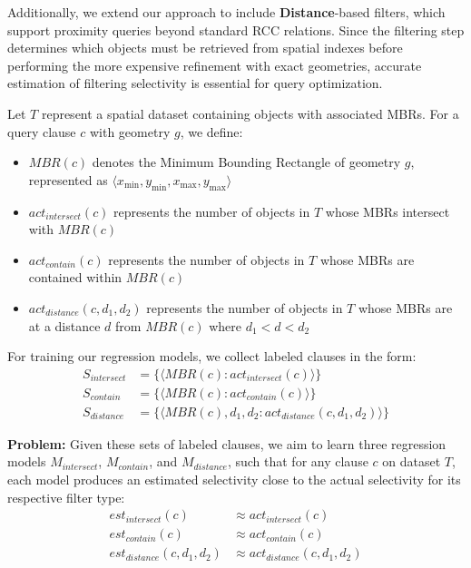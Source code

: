 \documentclass{article}
\begin{document}
Additionally, we extend our approach to include \textbf{Distance}-based filters, which support proximity queries beyond standard RCC relations. Since the filtering step determines which objects must be retrieved from spatial indexes before performing the more expensive refinement with exact geometries, accurate estimation of filtering selectivity is essential for query optimization.

Let $T$ represent a spatial dataset containing objects with associated MBRs. For a query clause $c$ with geometry $g$, we define:

\begin{itemize}
\item $MBR(c)$ denotes the Minimum Bounding Rectangle of geometry $g$, represented as $\langle x_{\min}, y_{\min}, x_{\max}, y_{\max} \rangle$
\item $act_{intersect}(c)$ represents the number of objects in $T$ whose MBRs intersect with $MBR(c)$
\item $act_{contain}(c)$ represents the number of objects in $T$ whose MBRs are contained within $MBR(c)$
\item $act_{distance}(c, d_1, d_2)$ represents the number of objects in $T$ whose MBRs are at a distance $d$ from $MBR(c)$ where $d_1 < d < d_2$
\end{itemize}

For training our regression models, we collect labeled clauses in the form:
\begin{align}
S_{intersect} &= \{\langle MBR(c): act_{intersect}(c) \rangle\} \\
S_{contain} &= \{\langle MBR(c): act_{contain}(c) \rangle\} \\
S_{distance} &= \{\langle MBR(c), d_1, d_2: act_{distance}(c, d_1, d_2) \rangle\}
\end{align}

\textbf{Problem:} Given these sets of labeled clauses, we aim to learn three regression models $M_{intersect}$, $M_{contain}$, and $M_{distance}$, such that for any clause $c$ on dataset $T$, each model produces an estimated selectivity close to the actual selectivity for its respective filter type:
\begin{align}
est_{intersect}(c) &\approx act_{intersect}(c) \\
est_{contain}(c) &\approx act_{contain}(c) \\
est_{distance}(c, d_1, d_2) &\approx act_{distance}(c, d_1, d_2)
\end{align}
\end{document}
